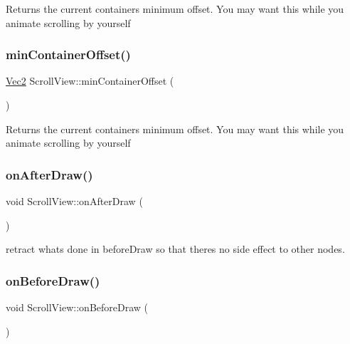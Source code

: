 Returns the current container\textquotesingle{}s minimum offset. You may want this while you animate scrolling by yourself \mbox{\label{classScrollView_a53daf6cba39b0e1340d66728394c6a41}} 
\subsubsection{\texorpdfstring{min\+Container\+Offset()}{minContainerOffset()}\hspace{0.1cm}{\footnotesize\ttfamily [2/2]}}
{\footnotesize\ttfamily \hyperlink{classVec2}{Vec2} Scroll\+View\+::min\+Container\+Offset (\begin{DoxyParamCaption}{ }\end{DoxyParamCaption})}

Returns the current container\textquotesingle{}s minimum offset. You may want this while you animate scrolling by yourself \mbox{\label{classScrollView_a5c8a81ace51864941969d9fc1e4cc505}} 
\subsubsection{\texorpdfstring{on\+After\+Draw()}{onAfterDraw()}}
{\footnotesize\ttfamily void Scroll\+View\+::on\+After\+Draw (\begin{DoxyParamCaption}{ }\end{DoxyParamCaption})\hspace{0.3cm}{\ttfamily [protected]}}

retract what\textquotesingle{}s done in before\+Draw so that there\textquotesingle{}s no side effect to other nodes. \mbox{\label{classScrollView_acffe0b2442bc6ef4d9f3885c536e6c44}} 
\subsubsection{\texorpdfstring{on\+Before\+Draw()}{onBeforeDraw()}}
{\footnotesize\ttfamily void Scroll\+View\+::on\+Before\+Draw (\begin{DoxyParamCaption}{ }\end{DoxyParamCaption})\hspace{0.3cm}{\ttfamily [protected]}}

